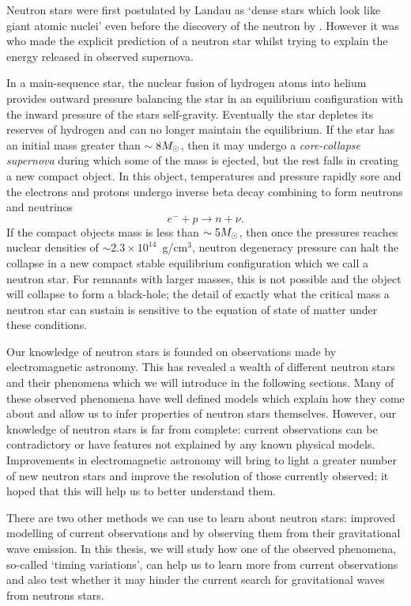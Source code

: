 \documentclass[../full_thesis/full_thesis.tex]{subfiles}
\begin{document}
 

Neutron stars were first postulated by Landau as `dense stars
which look like giant atomic nuclei' \citep{Yakovlev2013} even before the
discovery of the neutron by \citet{Chadwick1932}. However it was
\citet{Baade1934} who made the explicit prediction of a neutron star whilst
trying to explain the energy released in observed supernova.

In a main-sequence star, the nuclear fusion of
hydrogen atoms into helium provides outward pressure balancing the star in an
equilibrium configuration with the inward pressure of the stars self-gravity.
Eventually the star depletes its reserves of hydrogen and can no longer
maintain the equilibrium. If the star has an initial mass greater than $\sim 8
M_{\odot}$, then it may undergo a \emph{core-collapse supernova} during which some
of the mass is ejected, but the rest falls in creating a new compact object.
In this object, temperatures and pressure rapidly sore and the
electrons and protons undergo inverse beta decay combining to form neutrons and
neutrinos
\begin{equation}
    e^{-} + p \rightarrow n + \nu.
\end{equation}
If the compact objects mass is less than $\sim 5 M_{\odot}$, then once the pressures
reaches nuclear densities of $\sim 2.3 \times10^{14}$~g/cm$^{3}$, neutron
degeneracy pressure can halt the collapse in a new compact stable equilibrium
configuration which we call a neutron star. For remnants with larger masses,
this is not possible and the object will collapse to form a black-hole; the
detail of exactly what the critical mass a neutron star can sustain is
sensitive to the equation of state of matter under these conditions.

Our knowledge of neutron stars is founded on observations made by
electromagnetic astronomy. This has revealed a wealth of different neutron
stars and their phenomena which we will introduce in the following sections.
Many of these observed phenomena have well defined models which explain how
they come about and allow us to infer properties of neutron stars themselves.
However, our knowledge of neutron stars is far from complete: current
observations can be contradictory or have features not explained by any known
physical models. Improvements in electromagnetic astronomy will bring to light
a greater number of new neutron stars and improve the resolution of those
currently observed; it hoped that this will help us to better understand them.

There are two other methods we can use to learn about neutron stars: improved
modelling of current observations and by observing them from their
gravitational wave emission. In this thesis, we will study how one of the
observed phenomena, so-called `timing variations', can help us to learn more
from current observations and also test whether it may hinder the current
search for gravitational waves from neutrons stars.
\end{document}
